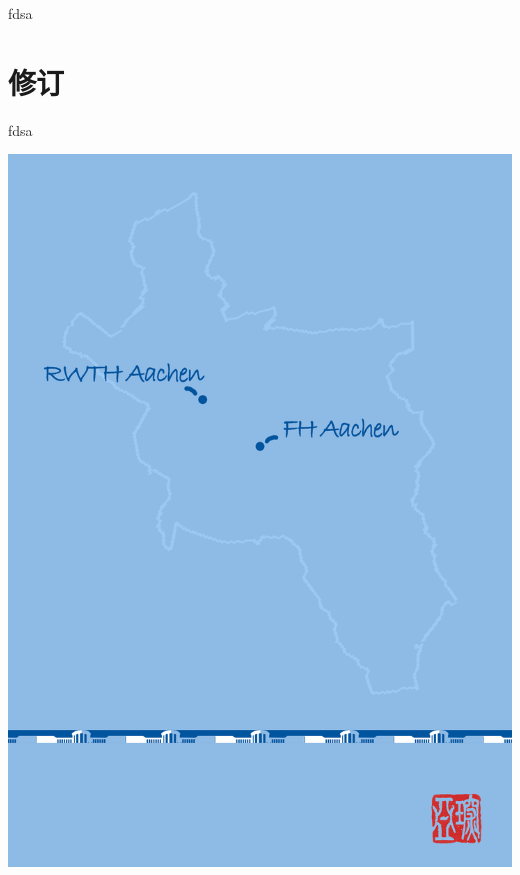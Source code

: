 \documentclass[a4paper,10pt,oneside]{scrbook}
\begin{document}
fdsa


\newpage

\chapter*{修订}

fdsa


\tableofcontents

\mainmatter





%
%
%
%
%


\begin{titlepage}
\parindent=0pt
\includegraphics[width=\linewidth]{Bilder/Back_Cover_.jpg}
\end{titlepage}
\end{document}
